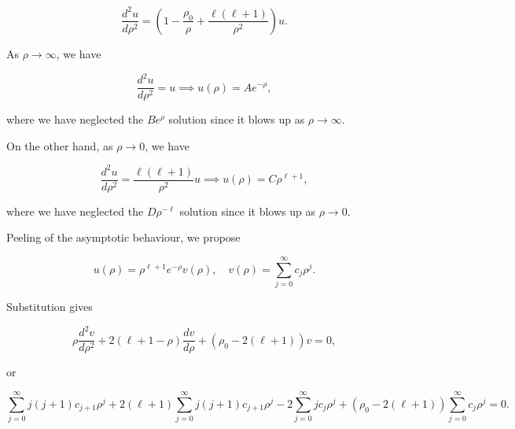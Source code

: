 \documentclass[a4paper,12pt]{report}
\begin{document}
\begin{equation}
  \frac{d^2u}{d\rho ^2} = \left( 1- \frac{\rho _{0} }{\rho } + \frac{\ell (\ell +1)}{\rho ^2}   \right) u.
\end{equation}

As \(\rho \to \infty\), we have 

\begin{equation}
  \frac{d^2u}{d\rho ^2} = u \implies u(\rho ) = Ae^{-\rho },   
\end{equation}

where we have neglected the \(Be^{\rho } \) solution since it blows up as \(\rho \to \infty\). 

On the other hand, as \(\rho \to 0\), we have 

\begin{equation}
  \frac{d^2u}{d\rho ^2} = \frac{\ell (\ell +1)}{\rho ^2} u \implies u(\rho ) = C \rho ^{\ell +1},  
\end{equation}

where we have neglected the \(D\rho ^{-\ell } \) solution since it blows up as \(\rho \to 0\).  

Peeling of the asymptotic behaviour, we propose

\begin{equation}
  u(\rho ) = \rho ^{\ell +1}e^{-\rho }v(\rho ), \quad v(\rho ) = \sum_{j=0}^{\infty} c_{j}\rho ^{j}.   
\end{equation}

Substitution gives 

\begin{equation}
  \rho \frac{d^2v}{d\rho ^2} + 2(\ell +1-\rho ) \frac{dv}{d\rho } + (\rho _{0} - 2(\ell +1) )v = 0,
\end{equation}

or 

\begin{equation}
  \sum_{j=0}^{\infty} j(j+1)c_{j+1}\rho ^{j} + 2(\ell +1)\sum_{j=0}^{\infty} j(j+1)c_{j+1}\rho ^{j} - 2\sum_{j=0}^{\infty} j c_{j}\rho ^{j} + (\rho _{0} - 2(\ell +1) ) \sum_{j=0}^{\infty}c_{j}\rho ^{j} = 0.
\end{equation}
\end{document}

